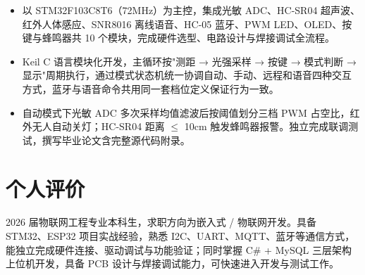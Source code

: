 \documentclass[10pt,a4paper]{article}
\begin{document}
\begin{itemize}[leftmargin=1.5em, itemsep=2pt, parsep=0pt, topsep=2pt]
    \item 以 STM32F103C8T6（72MHz）为主控，集成光敏 ADC、HC-SR04 超声波、红外人体感应、SNR8016 离线语音、HC-05 蓝牙、PWM LED、OLED、按键与蜂鸣器共 10 个模块，完成硬件选型、电路设计与焊接调试全流程。
    \item Keil C 语言模块化开发，主循环按"测距 → 光强采样 → 按键 → 模式判断 → 显示"周期执行，通过模式状态机统一协调自动、手动、远程和语音四种交互方式，蓝牙与语音命令共用同一套档位定义保证行为一致。
    \item 自动模式下光敏 ADC 多次采样均值滤波后按阈值划分三档 PWM 占空比，红外无人自动关灯；HC-SR04 距离 $\leq$ 10cm 触发蜂鸣器报警。独立完成联调测试，撰写毕业论文含完整源代码附录。
\end{itemize}

\vspace{0.15em}

\section{\faUser\hspace{0.4em}个人评价}

2026 届物联网工程专业本科生，求职方向为嵌入式 / 物联网开发。具备 STM32、ESP32 项目实战经验，熟悉 I2C、UART、MQTT、蓝牙等通信方式，能独立完成硬件连接、驱动调试与功能验证；同时掌握 C\# + MySQL 三层架构上位机开发，具备 PCB 设计与焊接调试能力，可快速进入开发与测试工作。
\end{document}
